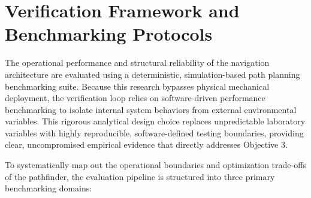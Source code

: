 \section{Verification Framework and Benchmarking Protocols}

The operational performance and structural reliability of the navigation architecture are evaluated
using a deterministic, simulation-based path planning benchmarking suite. Because this research
bypasses physical mechanical deployment, the verification loop relies on software-driven performance
benchmarking to isolate internal system behaviors from external environmental variables. This
rigorous analytical design choice replaces unpredictable laboratory variables with highly
reproducible, software-defined testing boundaries, providing clear, uncompromised empirical evidence
that directly addresses Objective 3.

To systematically map out the operational boundaries and optimization trade-offs of the pathfinder,
the evaluation pipeline is structured into three primary benchmarking domains:

